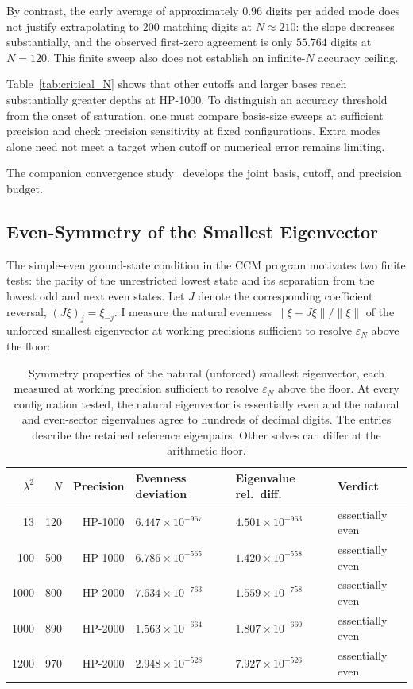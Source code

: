 \documentclass[11pt,a4paper]{article}
\begin{document}
By contrast, the
early average of approximately $0.96$ digits per added mode does not
justify extrapolating to 200 matching digits at $N\approx210$: the
slope decreases substantially, and the observed first-zero agreement
is only $55.764$ digits at $N=120$. This finite sweep also does not
establish an infinite-$N$ accuracy ceiling.

Table~\ref{tab:critical_N} shows that other cutoffs and larger bases
reach substantially greater depths at HP-1000. To distinguish an
accuracy threshold from the onset of saturation, one must compare
basis-size sweeps at sufficient precision and check precision
sensitivity at fixed configurations. Extra modes alone need not meet
a target when cutoff or numerical error remains limiting.

The companion convergence study~\cite{Andrews2026ConvergenceLaw} develops
the joint basis, cutoff, and precision budget.

\subsection{Even-Symmetry of the Smallest Eigenvector}
\label{sec:evenness}

The simple-even ground-state condition in the CCM program motivates
two finite tests: the parity of the unrestricted lowest state and its
separation from the lowest odd and next even states. Let $J$ denote
the corresponding coefficient reversal, $(J\xi)_j=\xi_{-j}$. I
measure the natural evenness $\|\xi-J\xi\|/\|\xi\|$ of the
unforced smallest eigenvector at working precisions sufficient to
resolve $\varepsilon_N$ above the floor:

\begin{table}[!htbp]
\centering
\caption{Symmetry properties of the natural (unforced) smallest
eigenvector, each measured at working precision sufficient to
resolve $\varepsilon_N$ above the floor. At every configuration
tested, the natural eigenvector is essentially even and the
natural and even-sector eigenvalues agree to hundreds of decimal
digits. The entries describe the retained reference eigenpairs. Other
solves can differ at the arithmetic floor.}
\label{tab:evenness}
\begin{tabular}{@{}rrrlll@{}}
\toprule
$\lambda^2$ & $N$ & Precision & Evenness deviation & Eigenvalue rel.\ diff. & Verdict \\
\midrule
13    & 120  & HP-1000  & $6.447 \times 10^{-967}$  & $4.501 \times 10^{-963}$ & essentially even \\
100   & 500  & HP-1000  & $6.786 \times 10^{-565}$  & $1.420 \times 10^{-558}$ & essentially even \\
1000  & 800  & HP-2000  & $7.634 \times 10^{-763}$  & $1.559 \times 10^{-758}$ & essentially even \\
1000  & 890  & HP-2000  & $1.563 \times 10^{-664}$  & $1.807 \times 10^{-660}$ & essentially even \\
1200  & 970  & HP-2000  & $2.948 \times 10^{-528}$  & $7.927 \times 10^{-526}$ & essentially even \\
\bottomrule
\end{tabular}
\end{table}
\end{document}
